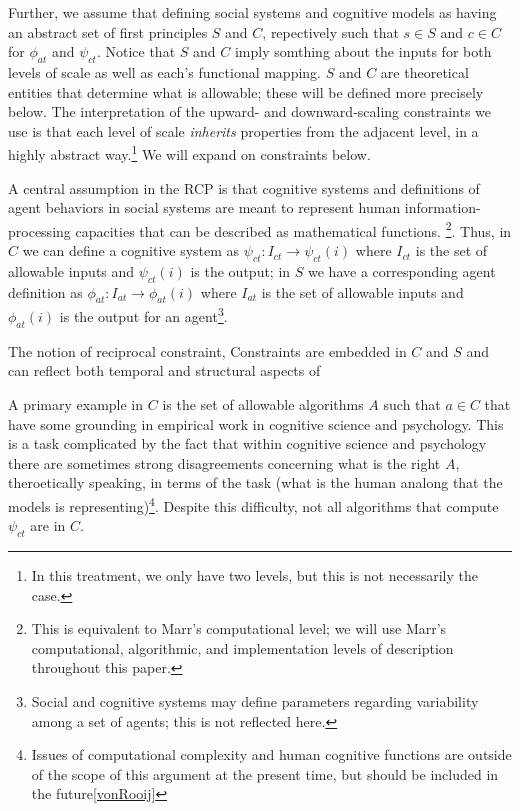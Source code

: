 \documentclass{article}
\begin{document}
Further, we assume that defining social systems and cognitive models as having an abstract set of first principles $S$ and $C$, repectively such that $s \in S$ and $c \in C$ for $\phi_{at}$ and $\psi_{ct}$. Notice that $S$ and $C$ imply somthing about the inputs for both levels of scale as well as each's functional mapping.  $S$ and $C$ are theoretical entities that determine what is allowable; these will be defined more precisely below. The interpretation of the upward- and downward-scaling constraints we use is that each level of scale \textit{inherits} properties from the adjacent level, in a highly abstract way.\footnote{In this treatment, we only have two levels, but this is not necessarily the case.}  We will expand on constraints below. 

A central assumption in the RCP is that cognitive systems and definitions of agent behaviors in social systems are meant to represent human information-processing capacities that can be described as mathematical functions. \cite{van Rooij, 2008}\footnote{This is equivalent to Marr's computational level; we will use Marr's computational, algorithmic, and implementation levels of description\cite{Marr,1981} throughout this paper.}. Thus, in $C$ we can define a cognitive system as $\psi_{ct}: I_{ct} \rightarrow \psi_{ct}(i)$ where $I_{ct}$ is the set of allowable inputs and $\psi_{ct}(i)$ is the output; in $S$ we have a corresponding agent definition as $\phi_{at}: I_{at} \rightarrow \phi_{at}(i)$ where $I_{at}$ is the set of allowable inputs and $\phi_{at}(i)$ is the output for an agent\footnote{Social and cognitive systems may define parameters regarding variability among a set of agents; this is not reflected here.}.   

The notion of reciprocal constraint, Constraints are embedded in $C$ and $S$ and can reflect both temporal and structural aspects of

A primary example in $C$ is the set of allowable algorithms $A$ such that $a \in C$ that have some grounding in empirical work in cognitive science and psychology.  This is a task complicated by the fact that within cognitive science and psychology there are sometimes strong disagreements concerning what is the right $A$, theroetically speaking, in terms of the task (what is the human analong that the models is representing)\footnote{Issues of computational complexity and human cognitive functions are outside of the scope of this argument at the present time, but should be included in the future\ref{vonRooij}}.  Despite this difficulty, not all algorithms that compute $\psi_{ct}$ are in $C$.  
\end{document}
